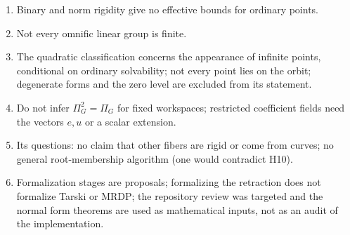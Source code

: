 \documentclass[11pt,oneside]{article}
\numberwithin{equation}{section}
\theoremstyle{definition}
\theoremstyle{remark}
\begin{document}
\begin{enumerate}[leftmargin=*,itemsep=1pt]
\item Binary and norm rigidity give no effective bounds for ordinary points.
\item Not every omnific linear group is finite.
\item The quadratic classification concerns the appearance of infinite points,
conditional on ordinary solvability; not every point lies on the orbit;
degenerate forms and the zero level are excluded from its statement.
\item Do not infer $\Pi_G^2=\Pi_G$ for fixed workspaces; restricted
coefficient fields need the vectors $e,u$ or a scalar extension.
\item Its questions: no claim that other fibers are rigid or come from curves;
no general root-membership algorithm (one would contradict H10).
\item Formalization stages are proposals; formalizing the retraction does not
formalize Tarski or MRDP; the repository review was targeted and the normal
form theorems are used as mathematical inputs, not as an audit of the
implementation.
\end{enumerate}
\end{document}
